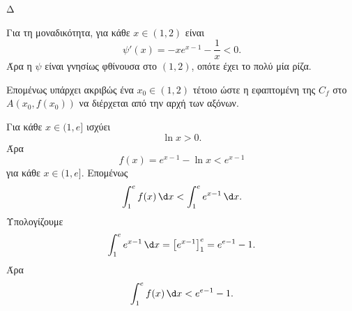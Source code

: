 \begin{thema}{Δ}
\begin{erwthma}
Για τη μοναδικότητα, για κάθε $x\in(1,2)$ είναι
\[
\psi'(x)=-xe^{x-1}-\frac{1}{x}<0.
\]
Άρα η $\psi$ είναι γνησίως φθίνουσα στο $(1,2)$, οπότε έχει το πολύ μία ρίζα.

Επομένως υπάρχει ακριβώς ένα $x_0\in(1,2)$ τέτοιο ώστε η εφαπτομένη της $C_f$ στο $A(x_0,f(x_0))$ να διέρχεται από την αρχή των αξόνων.

\item Για κάθε $x\in(1,e]$ ισχύει
\[
\ln x>0.
\]
Άρα
\[
f(x)=e^{x-1}-\ln x<e^{x-1}
\]
για κάθε $x\in(1,e]$. Επομένως
\[
\dint_1^e f(x)\,\d x<\dint_1^e e^{x-1}\,\d x.
\]
Υπολογίζουμε
\[
\dint_1^e e^{x-1}\,\d x=\left[e^{x-1}\right]_1^e=e^{e-1}-1.
\]
Άρα
\[
{\dint_1^e f(x)\,\d x<e^{e-1}-1}.
\]
\end{erwthma}
\end{thema}
